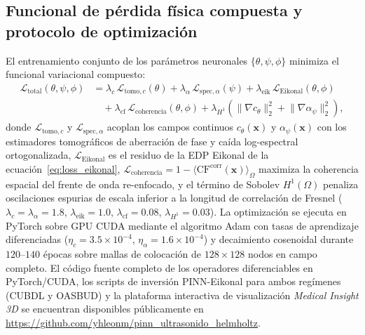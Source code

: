 \documentclass[9pt]{article}
\begin{document}
\subsection{Funcional de pérdida física compuesta y protocolo de optimización}
\label{subsec:loss}

El entrenamiento conjunto de los parámetros neuronales $\{\theta, \psi, \phi\}$ minimiza el funcional variacional compuesto:
\begin{equation}
\begin{aligned}
\mathcal{L}_{\text{total}}(\theta, \psi, \phi) &= \lambda_c\,\mathcal{L}_{\text{tomo},c}(\theta) + \lambda_\alpha\,\mathcal{L}_{\text{spec},\alpha}(\psi) + \lambda_{\text{eik}}\,\mathcal{L}_{\text{Eikonal}}(\theta, \phi) \\
&\quad + \lambda_{\text{cf}}\,\mathcal{L}_{\text{coherencia}}(\theta, \phi) + \lambda_{H^1}\!\left(\lVert\nabla c_\theta\rVert_{2}^2 + \lVert\nabla\alpha_\psi\rVert_{2}^2\right),
\end{aligned}
\label{eq:total_loss}
\end{equation}
donde $\mathcal{L}_{\text{tomo},c}$ y $\mathcal{L}_{\text{spec},\alpha}$ acoplan los campos continuos $c_\theta(\mathbf{x})$ y $\alpha_\psi(\mathbf{x})$ con los estimadores tomográficos de aberración de fase y caída log-espectral ortogonalizada, $\mathcal{L}_{\text{Eikonal}}$ es el residuo de la EDP Eikonal de la ecuación~\eqref{eq:loss_eikonal}, $\mathcal{L}_{\text{coherencia}} = 1 - \langle\text{CF}^{\text{corr}}(\mathbf{x})\rangle_\Omega$ maximiza la coherencia espacial del frente de onda re-enfocado, y el término de Sobolev $H^1(\Omega)$ penaliza oscilaciones espurias de escala inferior a la longitud de correlación de Fresnel ($\lambda_c = \lambda_\alpha = 1.8$, $\lambda_{\text{eik}} = 1.0$, $\lambda_{\text{cf}} = 0.08$, $\lambda_{H^1} = 0.03$). La optimización se ejecuta en PyTorch sobre GPU CUDA mediante el algoritmo Adam con tasas de aprendizaje diferenciadas ($\eta_c = 3.5 \times 10^{-4}$, $\eta_\alpha = 1.6 \times 10^{-4}$) y decaimiento cosenoidal durante $120\text{--}140$ épocas sobre mallas de colocación de $128 \times 128$ nodos en campo completo. El código fuente completo de los operadores diferenciables en PyTorch/CUDA, los scripts de inversión PINN-Eikonal para ambos regímenes (CUBDL y OASBUD) y la plataforma interactiva de visualización \textit{Medical Insight 3D} se encuentran disponibles públicamente en \url{https://github.com/yhleonm/pinn_ultrasonido_helmholtz}.

\end{document}
